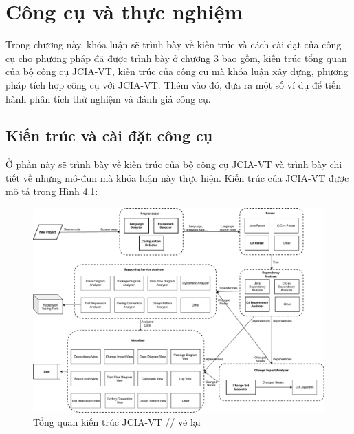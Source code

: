 \documentclass[12pt]{report}
\begin{document}
\chapter{Công cụ và thực nghiệm}
Trong chương này, khóa luận sẽ trình bày về kiến trúc và cách cài đặt của công cụ cho phương pháp đã được trình bày ở chương 3 bao gồm, kiến trúc tổng quan của bộ công cụ JCIA-VT, kiến trúc của công cụ mà khóa luận xây dựng, phương pháp tích hợp công cụ với JCIA-VT. Thêm vào đó, đưa ra một số ví dụ để tiến hành phân tích thử nghiệm và đánh giá công cụ.

\newpage
\section{Kiến trúc và cài đặt công cụ}
Ở phần này sẽ trình bày về kiến trúc của bộ công cụ JCIA-VT và trình bày chi tiết về những mô-đun mà khóa luận này thực hiện. Kiến trúc của JCIA-VT được mô tả trong Hình 4.1:

\begin{figure}[h]
	\centering
	\includegraphics[scale=0.2]{images/architexture}
	\caption{Tổng quan kiến trúc JCIA-VT // vẽ lại}
	\label{fig:architexture}
\end{figure}
\end{document}
